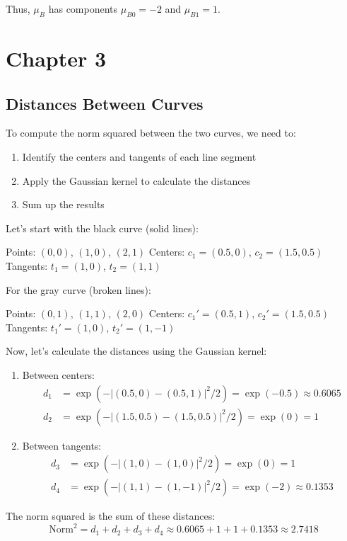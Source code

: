 \documentclass{article}
\begin{document}
Thus, \( \mu_B \) has components \( \mu_{B0} = -2 \) and \( \mu_{B1} = 1 \).

\newpage
\section{Chapter 3}
\subsection{Distances Between Curves}

To compute the norm squared between the two curves, we need to:
\begin{enumerate}
    \item Identify the centers and tangents of each line segment
    \item Apply the Gaussian kernel to calculate the distances
    \item Sum up the results
\end{enumerate}

Let's start with the black curve (solid lines):

Points: $(0,0)$, $(1,0)$, $(2,1)$
Centers: $c_1 = (0.5, 0)$, $c_2 = (1.5, 0.5)$
Tangents: $t_1 = (1, 0)$, $t_2 = (1, 1)$

For the gray curve (broken lines):

Points: $(0,1)$, $(1,1)$, $(2,0)$
Centers: $c_1' = (0.5, 1)$, $c_2' = (1.5, 0.5)$
Tangents: $t_1' = (1, 0)$, $t_2' = (1, -1)$

Now, let's calculate the distances using the Gaussian kernel:

\begin{enumerate}
    \item Between centers:
    \begin{align*}
        d_1 &= \exp(-|(0.5,0) - (0.5,1)|^2 / 2) = \exp(-0.5) \approx 0.6065 \\
        d_2 &= \exp(-|(1.5,0.5) - (1.5,0.5)|^2 / 2) = \exp(0) = 1
    \end{align*}

    \item Between tangents:
    \begin{align*}
        d_3 &= \exp(-|(1,0) - (1,0)|^2 / 2) = \exp(0) = 1 \\
        d_4 &= \exp(-|(1,1) - (1,-1)|^2 / 2) = \exp(-2) \approx 0.1353
    \end{align*}
\end{enumerate}

The norm squared is the sum of these distances:
\[
\text{Norm}^2 = d_1 + d_2 + d_3 + d_4 \approx 0.6065 + 1 + 1 + 0.1353 \approx 2.7418
\]
\end{document}
